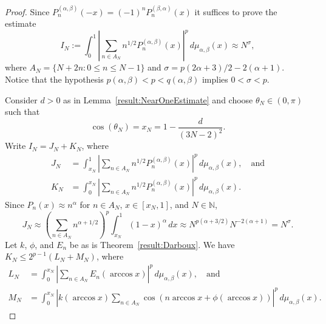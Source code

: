 \documentclass[11pt, leqno]{amsart}
\theoremstyle{remark}
\numberwithin{equation}{section}
\newcommand{\NN}{\ensuremath{\mathbb{N}}}
\begin{document}
\begin{proof}
 Since $P_n^{(\alpha,\beta)}(-x)=(-1)^n P_n^{(\beta,\alpha)}(x)$ it suffices to prove the estimate
\begin{equation*}
\label{eq:esti-alpha}
I_N := \int_0^1\left|\sum_{n\in A_N} n^{1/2} P_{n}^{(\alpha,\beta)}(x)\right|^p \, d\mu_{\alpha,\beta}(x) \approx N^\sigma,
\end{equation*}
where $A_N=\{N+2n : 0\le n\le N-1\}$ and $\sigma=p(2\alpha+3)/2-2(\alpha+1)$. Notice that the hypothesis $p(\alpha,\beta)<p<q(\alpha,\beta)$ implies $0<\sigma<p$.

Consider $d>0$ as in Lemma~\ref{result:NearOneEstimate} and choose $\theta_N\in(0,\pi)$ such that
\[
\cos(\theta_N)=x_N=1-\frac{d}{(3N-2)^2}.
\]
Write $I_N=J_N+K_N$, where
\begin{align*}
J_N &= \int_{x_N}^1 \left|\sum_{n\in A_N} n^{1/2} 
P_{n}^{(\alpha,\beta)}(x)\right|^p \, d\mu_{\alpha,\beta}(x),\quad \text{and}\\
K_N &= \int_{0}^{x_N} \left|\sum_{n\in A_N} n^{1/2} P_{n}^{(\alpha,\beta)}(x) \right|^p \, d\mu_{\alpha,\beta}(x).
\end{align*}
Since $P_n(x)\approx n^\alpha$ for  $n\in A_N$, $x\in[x_N,1]$, and $N\in\NN$,
\[
J_N\approx \left(\sum_{n\in A_N} n^{\alpha+1/2} \right)^p \int_{x_N}^1 (1-x)^\alpha\, dx \approx N^{p(\alpha+3/2)} N^{-2(\alpha +1)} = N^{\sigma}.
\]
Let $k$, $\phi$, and $E_n$ be as is Theorem~\ref{result:Darboux}.
We have $K_N \le 2^{p-1} (L_N+ M_N)$, where
\begin{align*}
L_N &= \int_0^{x_N}\left| \sum_{n\in A_N} E_{n}(\arccos x) \right|^p \, d\mu_{\alpha,\beta}(x),
\quad\text{and} \\
M_N &= \int_0^{x_N}\left| k(\arccos x) \sum_{n\in A_N} \cos(n \arccos x+\phi(\arccos x) )\right|^p \, d\mu_{\alpha,\beta}(x).
\end{align*}


\end{proof}
\end{document}
